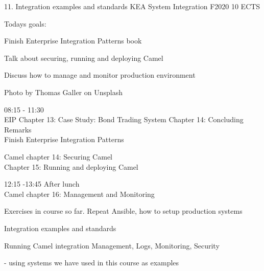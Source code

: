 \documentclass[Screen16to9,17pt]{foils}
\begin{document}
\mytitlepage
{11. Integration examples and standards}
{KEA System Integration F2020 10 ECTS}






Todays goals:
\begin{list2}
\item Finish Enterprise Integration Patterns book
\item Talk about securing, running and deploying Camel
\item Discuss how to manage and monitor production environment
\end{list2}

Photo by Thomas Galler on Unsplash




\begin{list2}
\item 08:15 - 11:30 \\
EIP Chapter 13: Case Study: Bond Trading System
Chapter 14: Concluding Remarks\\
Finish Enterprise Integration Patterns
\item Camel chapter 14: Securing Camel\\
Chapter 15: Running and deploying Camel
\item 12:15 -13:45 After lunch \\
Camel chapter 16: Management and Monitoring
\item Exercises in course so far. Repeat Ansible, how to setup production systems
\end{list2}





\begin{list2}
\item Integration examples and standards
\item Running Camel integration Management, Logs, Monitoring, Security
\item - using systems we have used in this course as examples
\end{list2}
\end{document}
